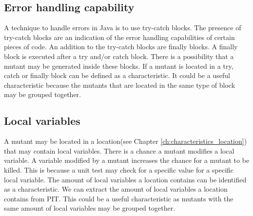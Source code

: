 \documentclass[../main]{subfiles}
\begin{document}
\subsection{Error handling capability}
A technique to handle errors in Java is to use try-catch blocks\cite{javaDocs}. 
The presence of try-catch blocks are an indication of the error handling capabilities of certain pieces of code.
An addition to the try-catch blocks are finally blocks.
A finally block is executed after a try and/or catch block\cite{javaDocs}.
There is a possibility that a mutant may be generated inside these blocks.
If a mutant is located in a try, catch or finally block can be defined as a characteristic.
It could be a useful characteristic because the mutants that are located in the same type of block may be grouped together.

\subsection{Local variables}
A mutant may be located in a location(see Chapter \ref{ch:characteristics_location}) that may contain local variables.
There is a chance a mutant modifies a local variable.
A variable modified by a mutant increases the chance for a mutant to be killed.
This is because a unit test may check for a specific value for a specific local variable.
The amount of local variables a location contains can be identified as a characteristic.
We can extract the amount of local variables a location contains from PIT.
This could be a useful characteristic as mutants with the same amount of local variables may be grouped together.
\end{document}

